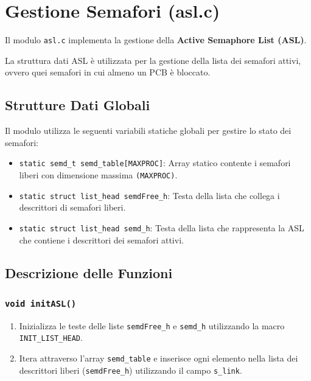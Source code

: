 \documentclass[a4paper,12pt]{article}
\begin{document}
\section{Gestione Semafori (asl.c)}
Il modulo \texttt{asl.c} implementa la gestione della \textbf{Active Semaphore List (ASL)}.

La struttura dati ASL è utilizzata per la gestione della lista dei semafori attivi, ovvero quei semafori in cui almeno un PCB è bloccato.

\vspace{0.5cm}
\subsection{Strutture Dati Globali}
Il modulo utilizza le seguenti variabili statiche globali per gestire lo stato dei semafori:

\begin{itemize}
    \item \texttt{static semd\_t semd\_table[MAXPROC]}: Array statico contente i semafori liberi con dimensione massima \texttt{(MAXPROC)}.
    \item \texttt{static struct list\_head semdFree\_h}: Testa della lista che collega i descrittori di semafori liberi.
    \item \texttt{static struct list\_head semd\_h}: Testa della lista che rappresenta la ASL che contiene i descrittori dei semafori attivi.
\end{itemize}

\vspace{0.5cm}
\subsection{Descrizione delle Funzioni}

\subsubsection{\texttt{void initASL()}}
\begin{enumerate}
    \item Inizializza le teste delle liste \texttt{semdFree\_h} e \texttt{semd\_h} utilizzando la macro \texttt{INIT\_LIST\_HEAD}.
    \item Itera attraverso l'array \texttt{semd\_table} e inserisce ogni elemento nella lista dei descrittori liberi (\texttt{semdFree\_h}) utilizzando il campo \texttt{s\_link}.
\end{enumerate}
\end{document}
